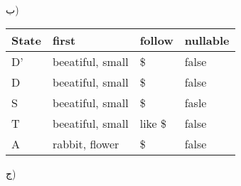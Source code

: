 ب)


\begin{center}
\begin{latin}
\begin{tabular}{|l|l|l|l|}
\hline
State & first            & follow  & nullable \\ \hline
D'    & beeatiful, small & \$      & false    \\ \hline
D     & beeatiful, small & \$      & false    \\ \hline
S     & beeatiful, small & \$      & fasle    \\ \hline
T     & beeatiful, small & like \$ & false    \\ \hline
A     & rabbit, flower   & \$      & false    \\ \hline
\end{tabular}
\end{latin}
\end{center}

ج)

